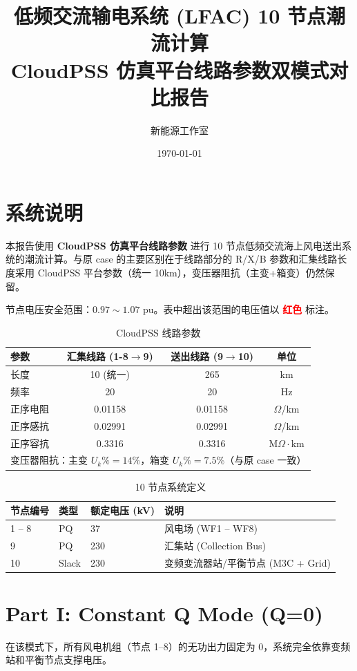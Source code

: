 \documentclass[11pt,a4paper]{ctexart}
\title{低频交流输电系统 (LFAC) 10 节点潮流计算\\CloudPSS 仿真平台线路参数双模式对比报告}
\author{新能源工作室}
\date{\today}
\newcommand{\vred}[1]{\textcolor{red}{\textbf{#1}}}
\begin{document}
\maketitle

\section{系统说明}
本报告使用 \textbf{CloudPSS 仿真平台线路参数} 进行 10 节点低频交流海上风电送出系统的潮流计算。与原 case 的主要区别在于线路部分的 R/X/B 参数和汇集线路长度采用 CloudPSS 平台参数（统一 10km），变压器阻抗（主变+箱变）仍然保留。

节点电压安全范围：$0.97 \sim 1.07$ pu。表中超出该范围的电压值以 \vred{红色} 标注。

\begin{table}[H]
\centering
\caption{CloudPSS 线路参数}
\begin{tabular}{lccc}
\toprule
参数 & 汇集线路 (1-8$\to$9) & 送出线路 (9$\to$10) & 单位 \\
\midrule
长度 & 10 (统一) & 265 & km \\
频率 & 20 & 20 & Hz \\
正序电阻 & 0.01158 & 0.01158 & $\Omega$/km \\
正序感抗 & 0.02991 & 0.02991 & $\Omega$/km \\
正序容抗 & 0.3316 & 0.3316 & M$\Omega\cdot$km \\
\midrule
\multicolumn{4}{l}{变压器阻抗：主变 $U_k\%=14\%$，箱变 $U_k\%=7.5\%$（与原 case 一致）} \\
\bottomrule
\end{tabular}
\end{table}

\begin{table}[H]
\centering
\caption{10 节点系统定义}
\begin{tabular}{llll}
\toprule
节点编号 & 类型 & 额定电压 (kV) & 说明 \\
\midrule
1 -- 8 & PQ & 37 & 风电场 (WF1 -- WF8) \\
9 & PQ & 230 & 汇集站 (Collection Bus) \\
10 & Slack & 230 & 变频变流器站/平衡节点 (M3C + Grid) \\
\bottomrule
\end{tabular}
\end{table}

\section{Part I: Constant Q Mode (Q=0)}
在该模式下，所有风电机组（节点 1--8）的无功出力固定为 0，系统完全依靠变频站和平衡节点支撑电压。
\end{document}
